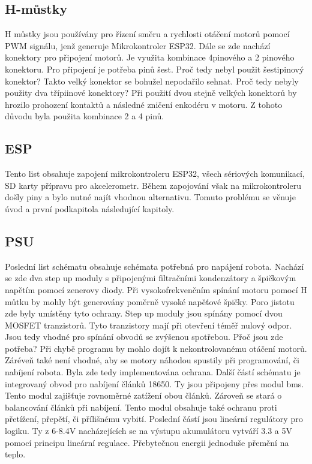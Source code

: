 \newpage


\subsection{H-můstky}

H můstky jsou používány pro řízení směru a rychlosti otáčení motorů pomocí PWM signálu, jenž generuje Mikrokontroler ESP32.
Dále se zde nachází konektory pro připojení motorů. Je využita kombinace 4pinového a 2 pinového konektoru. Pro připojení je potřeba pinů šest. Proč tedy nebyl použit šestipinový konektor? Takto velký konektor se bohužel nepodařilo sehnat.
Proč tedy nebyly použity dva třípiinové konektory? Při použití dvou stejně velkých konektorů by hrozilo prohození kontaktů a následné zničení enkodéru v motoru. Z tohoto důvodu byla použita kombinace 2 a 4 pinů.


\newpage

\subsection{ESP}
Tento list obsahuje zapojení mikrokontroleru ESP32, všech sériových komunikací, SD karty přípravu pro akcelerometr. Během zapojování však na mikrokontroleru došly piny a bylo nutné najít vhodnou alternativu. Tomuto problému se věnuje úvod a první podkapitola následující kapitoly.


\newpage

\subsection{PSU}
Poslední list schématu obsahuje schémata potřebná pro napájení robota. Nachází se zde dva step up moduly s připojenými filtračními kondenzátory a špičkovým napětím pomocí zenerovy diody. Při vysokofrekvenčním spínání motoru pomocí H můtku by mohly být generovány poměrně vysoké napěťové špičky. Poro jistotu zde byly umístěny tyto ochrany.
Step up moduly jsou spínány pomocí dvou MOSFET tranzistorů. Tyto tranzistory mají při otevření téměř nulový odpor. Jsou tedy vhodné pro spínání obvodů se zvýšenou spotřebou. Přoč jsou zde potřeba? Při chybě programu by mohlo dojít k nekontrolovanému otáčení motorů. Záréveň také není vhodné, aby se motory náhodou spustily při programování, či nabíjení robota. Byla zde tedy implementována ochrana.
Další částí schématu je integrovaný obvod pro nabíjení článků 18650. Ty jsou připojeny přes modul \ac{bms}. Tento modul zajišťuje rovnoměrné zatížení obou článků. Zároveň se stará o balancování článků při nabíjení. Tento modul obsahuje také ochranu proti přetížení, přepětí, či přílišnému vybití.
Poslední částí jsou lineární regulátory pro logiku. Ty z 6-8.4V nacházejících se na výstupu akumulátoru vytváří 3.3 a 5V pomocí principu lineární regulace. Přebytečnou energii jednoduše přemění na teplo.
\newpage
